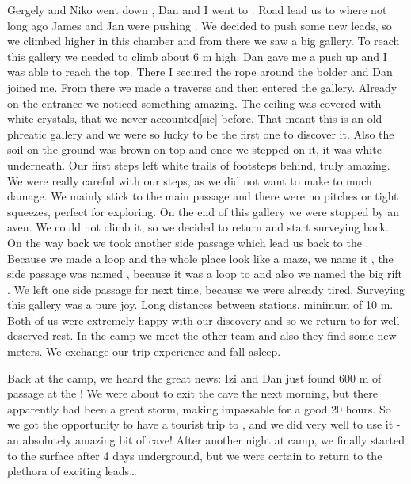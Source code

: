Gergely and Niko went down , Dan and I went to
. Road lead us to  where not
long ago James and Jan were pushing . We decided to push some
new leads, so we climbed higher in this chamber and from there we saw a
big gallery. To reach this gallery we needed to climb about 6 m high.
Dan gave me a push up and I was able to reach the top. There I secured
the rope around the bolder and Dan joined me. From there we made a
traverse and then entered the gallery. Already on the entrance we
noticed something amazing. The ceiling was covered with white crystals,
that we never accounted[sic] before. That meant this is an old phreatic
gallery and we were so lucky to be the first one to discover it. Also
the soil on the ground was brown on top and once we stepped on it, it
was white underneath. Our first steps left white trails of footsteps
behind, truly amazing. We were really careful with our steps, as we did
not want to make to much damage. We mainly stick to the main passage and
there were no pitches or tight squeezes, perfect for exploring. On the
end of this gallery we were stopped by an aven. We could not climb it,
so we decided to return and start surveying back. On the way back we
took another side passage which lead us back to the .
Because we made a loop and the whole place look like a maze, we name it
, the side passage was named , because it was a
loop to  and also we named the big rift . We
left one side passage for next time, because we were already tired.
Surveying this gallery was a pure joy. Long distances between stations,
minimum of 10 m. Both of us were extremely happy with our discovery and
so we return to  for well deserved rest. In the camp we meet
the other team and also they find some new meters. We exchange our trip
experience and fall asleep.






Back at the camp, we heard the great news: Izi and Dan just found 600 m
of passage at the ! We were about to exit the cave
the next morning, but there apparently had been a great storm, making
 impassable for a good 20 hours. So we got the opportunity
to have a tourist trip to , and we did very well to use
it - an absolutely amazing bit of cave! After another night at camp, we
finally started to the surface after 4 days underground, but we were
certain to return to the plethora of exciting leads\ldots{}

